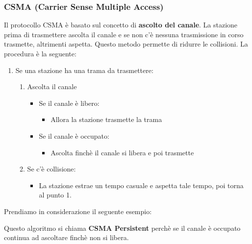 \documentclass[a4paper]{article}
\begin{document}
\subsubsection{CSMA (Carrier Sense Multiple Access)}
Il protocollo CSMA è basato sul concetto di \textbf{ascolto del canale}. La stazione
prima di trasmettere ascolta il canale e se non c'è nessuna trasmissione in corso
trasmette, altrimenti aspetta. Questo metodo permette di ridurre le collisioni.
La procedura è la seguente:
\begin{enumerate}
  \item Se una stazione ha una trama da trasmettere:
    \begin{enumerate}
      \item Ascolta il canale
        \begin{itemize}
          \item Se il canale è libero:
            \begin{itemize}
              \item Allora la stazione trasmette la trama
            \end{itemize}

          \item Se il canale è occupato:
            \begin{itemize}
              \item Ascolta finchè il canale si libera e poi trasmette
            \end{itemize}
        \end{itemize}

      \item Se c'è collisione:
        \begin{itemize}
          \item La stazione estrae un tempo casuale e aspetta tale tempo, poi torna
            al punto 1.
        \end{itemize}
    \end{enumerate}
\end{enumerate}

\begin{example}
  Prendiamo in considerazione il seguente esempio:
  \label{04-12-D5}
\end{example}
Questo algoritmo si chiama \textbf{CSMA Persistent} perchè se il canale è occupato
continua ad ascoltare finchè non si libera.
\end{document}
